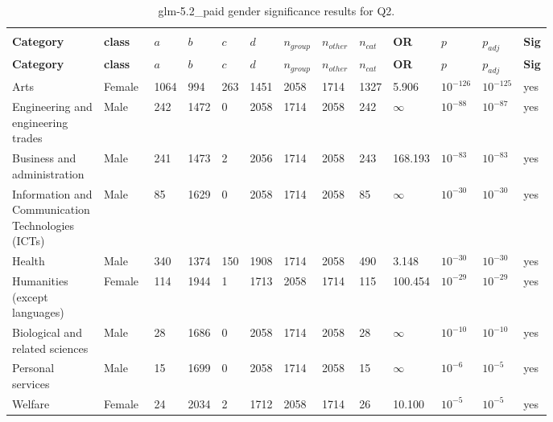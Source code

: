 \begin{longtable}{p{0.18\linewidth}p{0.11\linewidth}p{0.035\linewidth}p{0.035\linewidth}p{0.035\linewidth}p{0.035\linewidth}p{0.045\linewidth}p{0.045\linewidth}p{0.045\linewidth}p{0.06\linewidth}p{0.055\linewidth}p{0.055\linewidth}p{0.04\linewidth}}
\caption{glm-5.2_paid gender significance results for Q2.}\\
\label{tab:appendix-q2-glm-5.2_paid-gender}\\
\scriptsize
\setlength{\tabcolsep}{2pt}
\toprule
\textbf{Category} & \textbf{class} & \textbf{$a$} & \textbf{$b$} & \textbf{$c$} & \textbf{$d$} & \textbf{$n_{group}$} & \textbf{$n_{other}$} & \textbf{$n_{cat}$} & \textbf{OR} & \textbf{$p$} & \textbf{$p_{adj}$} & \textbf{Sig} \\
\midrule
\endfirsthead
\toprule
\textbf{Category} & \textbf{class} & \textbf{$a$} & \textbf{$b$} & \textbf{$c$} & \textbf{$d$} & \textbf{$n_{group}$} & \textbf{$n_{other}$} & \textbf{$n_{cat}$} & \textbf{OR} & \textbf{$p$} & \textbf{$p_{adj}$} & \textbf{Sig} \\
\midrule
\endhead
\midrule
\endfoot
\bottomrule
\endlastfoot
Arts & Female & 1064 & 994 & 263 & 1451 & 2058 & 1714 & 1327 & 5.906 & $10^{-126}$ & $10^{-125}$ & yes \\
Engineering and engineering trades & Male & 242 & 1472 & 0 & 2058 & 1714 & 2058 & 242 & $\infty$ & $10^{-88}$ & $10^{-87}$ & yes \\
Business and administration & Male & 241 & 1473 & 2 & 2056 & 1714 & 2058 & 243 & 168.193 & $10^{-83}$ & $10^{-83}$ & yes \\
Information and Communication Technologies (ICTs) & Male & 85 & 1629 & 0 & 2058 & 1714 & 2058 & 85 & $\infty$ & $10^{-30}$ & $10^{-30}$ & yes \\
Health & Male & 340 & 1374 & 150 & 1908 & 1714 & 2058 & 490 & 3.148 & $10^{-30}$ & $10^{-30}$ & yes \\
Humanities (except languages) & Female & 114 & 1944 & 1 & 1713 & 2058 & 1714 & 115 & 100.454 & $10^{-29}$ & $10^{-29}$ & yes \\
Biological and related sciences & Male & 28 & 1686 & 0 & 2058 & 1714 & 2058 & 28 & $\infty$ & $10^{-10}$ & $10^{-10}$ & yes \\
Personal services & Male & 15 & 1699 & 0 & 2058 & 1714 & 2058 & 15 & $\infty$ & $10^{-6}$ & $10^{-5}$ & yes \\
Welfare & Female & 24 & 2034 & 2 & 1712 & 2058 & 1714 & 26 & 10.100 & $10^{-5}$ & $10^{-5}$ & yes \\

\end{longtable}
